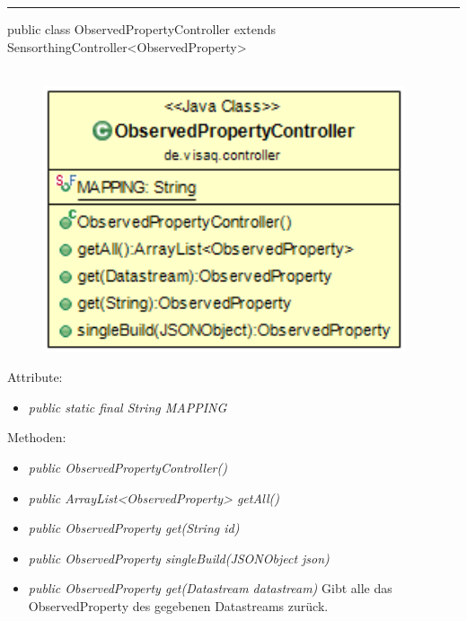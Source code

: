 \rule{\textwidth}{0.4pt}
public class ObservedPropertyController extends SensorthingController<ObservedProperty>
\\\\
\begin{minipage}{0.4\textwidth}
    \begin{figure}[H]
        {\centering\includegraphics[width=0.95\textwidth]{media/backend/controller/classes/ObservedPropertyController.png}}
    \end{figure}
    \end{minipage} \hfill
\begin{minipage}{0.6\textwidth}
\end{minipage}

Attribute:
\begin{itemize}
    \item \emph{public static final String MAPPING} \mappingDescription
\end{itemize}
Methoden:
\begin{itemize}
    \item \emph{public ObservedPropertyController()}
    \item \emph{public ArrayList<ObservedProperty> getAll()}
    \extendsSensorthingController
    \item \emph{public ObservedProperty get(String id)}
    \extendsSensorthingController
    \item \emph{public ObservedProperty singleBuild(JSONObject json)}
    \extendsSensorthingController
    \item \emph{public ObservedProperty get(Datastream datastream)}
    Gibt alle das ObservedProperty des gegebenen Datastreams zurück.
\end{itemize}

